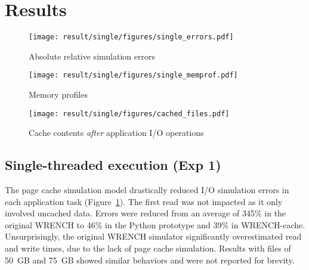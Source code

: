 \documentclass[conference]{IEEEtran}
\newcommand{\wrench}{WRENCH\xspace}
\begin{document}


    \section{Results}
    \label{results}

    \begin{figure*}
        \centering
        \begin{subfigure}{\linewidth}
            \centering
               \texttt{[image: result/single/figures/single\_errors.pdf]}
               \vspace*{-0.7cm}
               \caption{Absolute relative simulation errors}
               \vspace*{0.5cm}
               \label{fig:single_error}
            \end{subfigure}
        \begin{subfigure}{\linewidth}
            \centering
               \texttt{[image: result/single/figures/single\_memprof.pdf]}
               \vspace*{-0.7cm}
               \caption{Memory profiles}
               \vspace*{0.5cm}
               \label{fig:single_memprof}
        \end{subfigure}
        \begin{subfigure}{\linewidth}
            \centering
               \texttt{[image: result/single/figures/cached\_files.pdf]}
               \caption{Cache contents \emph{after} application I/O operations}
               \label{fig:single_cache}
        \end{subfigure}
        \caption{Single-threaded results (\textit{Exp 1})}
        \end{figure*}


        \subsection{Single-threaded execution (Exp 1)}

        The page cache simulation model drastically reduced I/O simulation
        errors in each application task (Figure~\ref{fig:single_error}). The first read was not impacted
        as it only involved uncached data. Errors were reduced from an average
        of 345\% in the original \wrench to 46\% in the Python prototype and
        39\% in \wrench-cache. Unsurprisingly, the original \wrench simulator
        significantly overestimated read and write times, due to the lack
        of page cache simulation. Results with files of 50~GB and 75~GB
        showed similar behaviors and were not reported for brevity.
\end{document}
